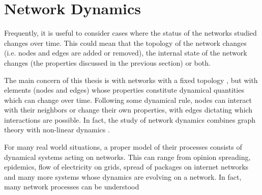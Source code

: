 \clearpage
\section{Network Dynamics}

Frequently, it is useful to consider cases where the status of the
networks studied changes over time. This could mean that the topology
of the network changes (i.e. nodes and edges are added or removed),
the internal state of the network changes (the properties discussed in
the previous section) or both. 

The main concern of this thesis is with networks with a fixed topology
, but with elements (nodes and edges) whose properties constitute
dynamical quantities which can change over time. Following some dynamical
rule, nodes can interact with their neighbors or change their own
properties, with edges dictating which interactions are possible.
In fact, the study of network dynamics combines graph theory with
non-linear dynamics \cite{book:Jost2007}.

For many real world situations, a proper model of their processes
consists of dynamical systems acting on networks. This can range
from opinion spreading, epidemics, flow of electricity on grids,
spread of packages on internet networks and many more systems
whose dynamics are evolving on a network. In fact, many network
processes can be understood 
